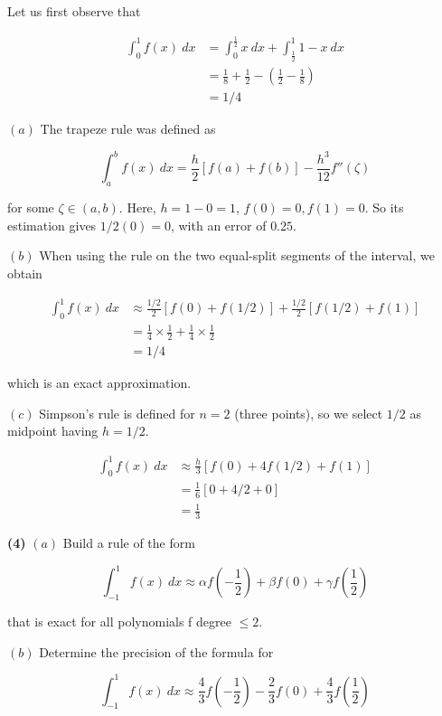 \documentclass[12pt]{article}
\theoremstyle{definition}
\begin{document}
Let us first observe that 

\begin{align*}
    \int_{0}^1 f(x) ~ dx 
    &= \int_0^{\frac{1}{2}} x ~ dx + \int_{\frac{1}{2}}^1 1
    - x ~ dx \\ 
    &= \frac{1}{8} + \frac{1}{2} - (\frac{1}{2} - \frac{1}{8}) \\ 
    &=1 / 4
\end{align*}

$(a)$ The trapeze rule was defined as 

\begin{equation*}
    \int_a^b f(x) ~ dx = \frac{h}{2}\left[ f(a) + f(b) \right] -
    \frac{h^3}{12}f''(\zeta)
\end{equation*}

for some $\zeta \in (a, b)$. Here, $h = 1 - 0 = 1$, $f(0) = 0, f(1) = 0$. So its
estimation gives $1 / 2 (0) = 0$, with an error of $0.25$.

$(b)$ When using the rule on the two equal-split segments of the interval, we
obtain 

\begin{align*}
    \int_0^1 f(x) ~ dx 
    &\approx \frac{1 / 2}{2}\left[ f(0) + f(1 / 2) \right] +
    \frac{1 / 2}{2}\left[ f( 1 / 2) + f(1) \right] \\ 
    &= \frac{1}{4} \times \frac{1}{2} + \frac{1}{4} \times \frac{1}{2} \\ 
    &= 1 / 4
\end{align*}

which is an exact approximation.

$(c)$ Simpson's rule is defined for $n = 2$ (three points), so we select $1 / 2$
as midpoint having $h = 1 / 2$. 

\begin{align*}
    \int_0^1 f(x) ~ dx 
    &\approx \frac{h}{3} \left[ f(0) + 4f(1 / 2) + f(1) \right] \\ 
    &=\frac{1}{6}\left[ 0 + 4 / 2 + 0 \right]  \\ 
    &=\frac{1}{3}
\end{align*}

\pagebreak 

\begin{shaded}
    \textbf{(4)} $(a)$ Build a rule of the form 

    \begin{equation*}
        \int_{-1}^1 f(x) ~ dx \approx \alpha f\left( -\frac{1}{2} \right) +
        \beta f(0) + \gamma f\left( \frac{1}{2} \right) 
    \end{equation*}

    that is exact for all polynomials f degree $\leq 2$.

    $(b)$ Determine the precision of the formula for 

    \begin{equation*}
        \int_{-1}^1 f(x) ~ dx \approx \frac{4}{3}f\left( -\frac{1}{2} \right)  -
        \frac{2}{3} f(0) + \frac{4}{3}f\left( \frac{1}{2} \right) 
    \end{equation*}
\end{shaded}
\end{document}
